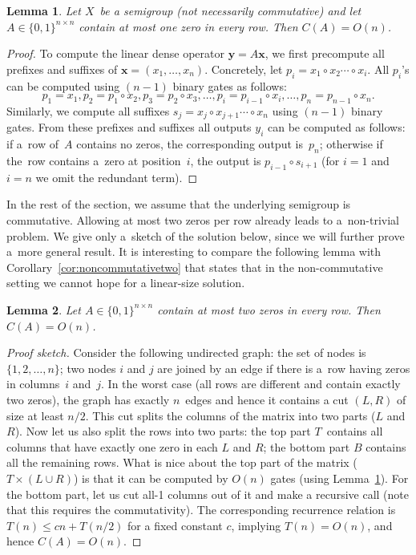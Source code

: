 \documentclass[11pt,letterpaper]{article}
\newtheorem{lemma}{Lemma}
\begin{document}
\begin{lemma}\label{lemma:easy}
Let $X$~be a semigroup (not necessarily commutative) and let
$A \in \{0,1\}^{n \times n}$ contain at most one zero in every row. Then
$C(A) = O(n)$.
\end{lemma}
\begin{proof}
To compute the linear dense operator $\mathbf{y} = A \mathbf{x}$, we first
precompute all prefixes and suffixes of $\mathbf{x}=(x_1, \dotsc, x_n)$.
Concretely, let $p_i=x_1 \circ x_2 \dotsb \circ x_i$. All $p_i$'s can be computed
using $(n-1)$ binary gates as follows:
\[
p_1=x_1, p_2=p_1 \circ x_2, p_3=p_2 \circ x_3, \dotsc, p_i=p_{i-1} \circ x_i, \dotsc, p_n=p_{n-1}\circ x_n.
\]
Similarly, we compute all suffixes $s_j=x_j \circ x_{j+1} \dotsb \circ x_n$ using
$(n-1)$ binary gates. From these prefixes and suffixes all outputs $y_i$ can be
computed as follows: if a~row of~$A$ contains no zeros, the corresponding
output is~$p_n$; otherwise if the~row contains a~zero at position~$i$, the
output is $p_{i-1} \circ s_{i+1}$ (for $i=1$ and $i=n$ we omit the redundant
term).
\end{proof}

In the rest of the section, we assume that the underlying semigroup is
commutative. Allowing at most two zeros per row already leads to a~non-trivial
problem. We give only a~sketch of the solution below, since we will further
prove a~more general result. It is interesting to compare the following lemma
with Corollary~\ref{cor:noncommutativetwo} that states that in the
non-commutative setting we cannot hope for a linear-size solution.

\begin{lemma} \label{lem:at_most_2}
Let $A \in \{0,1\}^{n \times n}$ contain at most two zeros in every row. Then
$C(A) = O(n)$.
\end{lemma}
\begin{proof}[Proof sketch]
Consider the following undirected graph: the set of nodes is $\{1,2,\dotsc,n\}$;
two nodes $i$ and $j$ are joined by an edge if there is a~row having zeros in
columns~$i$ and~$j$. In the worst case (all rows are different and contain
exactly two zeros), the graph has exactly $n$~edges and hence it contains a cut
$(L,R)$ of size at least $n/2$. This cut splits the columns of the matrix into
two parts ($L$ and $R$). Now let us also split the rows into two parts: the top
part $T$~contains all columns that have exactly one zero in each $L$ and $R$;
the bottom part $B$ contains all the remaining rows. What is nice about the top
part of the matrix ($T \times (L \cup R)$) is that it can be computed by $O(n)$
gates (using Lemma~\ref{lemma:easy}). For the bottom part, let us cut all-1
columns out of it and make a recursive call (note that this requires the
commutativity). The corresponding recurrence relation is $T(n) \le cn + T(n/2)$
for a fixed constant $c$, implying $T(n)=O(n)$, and hence $C(A) = O(n)$.
\end{proof}
\end{document}

